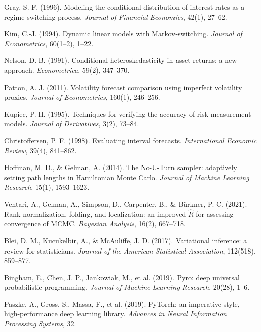 \documentclass[11pt,a4paper]{article}
\begin{document}
\begin{enumerate}[label={[\arabic*]}]
\item Gray, S. F. (1996). Modeling the conditional distribution of interest rates as
  a regime-switching process. \textit{Journal of Financial Economics}, 42(1), 27--62.
\item Kim, C.-J. (1994). Dynamic linear models with Markov-switching. \textit{Journal
  of Econometrics}, 60(1--2), 1--22.
\item Nelson, D. B. (1991). Conditional heteroskedasticity in asset returns: a new
  approach. \textit{Econometrica}, 59(2), 347--370.
\item Patton, A. J. (2011). Volatility forecast comparison using imperfect volatility
  proxies. \textit{Journal of Econometrics}, 160(1), 246--256.
\item Kupiec, P. H. (1995). Techniques for verifying the accuracy of risk measurement
  models. \textit{Journal of Derivatives}, 3(2), 73--84.
\item Christoffersen, P. F. (1998). Evaluating interval forecasts. \textit{International
  Economic Review}, 39(4), 841--862.
\item Hoffman, M. D., \& Gelman, A. (2014). The No-U-Turn sampler: adaptively setting
  path lengths in Hamiltonian Monte Carlo. \textit{Journal of Machine Learning
  Research}, 15(1), 1593--1623.
\item Vehtari, A., Gelman, A., Simpson, D., Carpenter, B., \& Bürkner, P.-C. (2021).
  Rank-normalization, folding, and localization: an improved $\hat R$ for assessing
  convergence of MCMC. \textit{Bayesian Analysis}, 16(2), 667--718.
\item Blei, D. M., Kucukelbir, A., \& McAuliffe, J. D. (2017). Variational inference:
  a review for statisticians. \textit{Journal of the American Statistical Association},
  112(518), 859--877.
\item Bingham, E., Chen, J. P., Jankowiak, M., et al. (2019). Pyro: deep universal
  probabilistic programming. \textit{Journal of Machine Learning Research}, 20(28),
  1--6.
\item Paszke, A., Gross, S., Massa, F., et al. (2019). PyTorch: an imperative style,
  high-performance deep learning library. \textit{Advances in Neural Information
  Processing Systems}, 32.
\end{enumerate}
\end{document}
